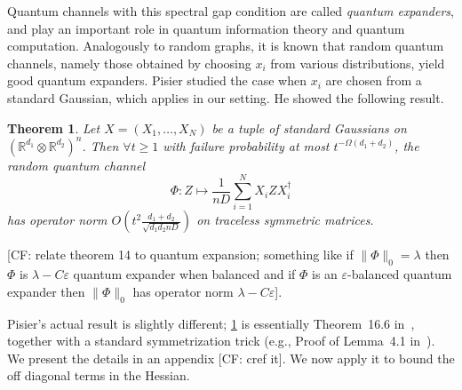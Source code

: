 \documentclass[aos]{imsart}
\newtheorem{theorem}{Theorem}
\newtheorem{corollary}[theorem]{Corollary}
\theoremstyle{definition}
\DeclareMathOperator{\tr}{Tr}
\newcommand{\R}{{\mathbb{R}}}
\newcommand{\ot}{\otimes}
\newcommand{\eps}{\varepsilon}
\newcommand{\Sym}{\mathcal{S}}
\newcommand{\CF}[1]{{\color{purple}[CF: #1]}}
\begin{document}
Quantum channels with this spectral gap condition are called \emph{quantum expanders}, and play an important role in quantum information theory and quantum computation. Analogously to random graphs, it is known that random quantum channels, namely those obtained by choosing $x_i$ from various distributions, yield good quantum expanders. Pisier studied the case when $x_i$ are chosen from a standard Gaussian, which applies in our setting. He showed the following result.


\begin{theorem}\label{thm:hess-pisier} Let $X = (X_1, \dots, X_N)$ be a tuple of standard Gaussians on $(\R^{d_1}\ot \R^{d_2})^n$. Then $\forall t \geq 1$ with failure probability at most $t^{-\Omega(d_{1} + d_{2})}$, the random quantum channel
$$\Phi: Z \mapsto \frac{1}{nD}\sum_{i = 1}^N X_i Z X_i^\dagger$$
has operator norm
$O \left( t^{2} \frac{d_{1}+d_{2}}{\sqrt{d_{1} d_{2} nD}} \right)$ on traceless symmetric matrices. \end{theorem}

\CF{relate theorem 14 to quantum expansion; something like if $\|\Phi\|_0 = \lambda$ then $\Phi$ is $\lambda - C \eps$ quantum expander when balanced and if $\Phi$ is an $\eps$-balanced quantum expander then $\|\Phi\|_0$ has operator norm $\lambda - C \eps$}.

Pisier's actual result is slightly different; \cref{thm:hess-pisier} is essentially Theorem~16.6 in~\cite{pisier2012grothendieck}, together with a standard symmetrization trick (e.g., Proof of Lemma~4.1 in~\cite{P14}). We present the details in an appendix \CF{cref it}. We now apply it to bound the off diagonal terms in the Hessian.

\end{document}
